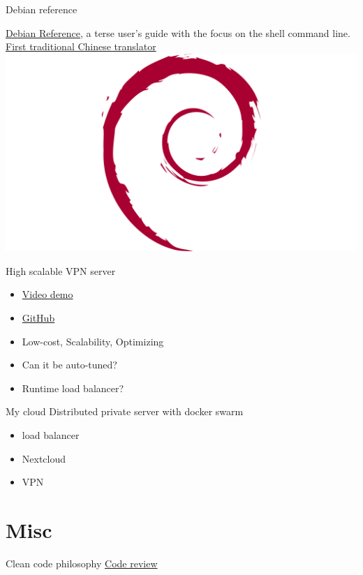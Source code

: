 \documentclass{beamer}
\begin{document}
\begin{frame}{Debian reference}
    \begin{multicols*}{2}
        {
            \href{https://www.debian.org/doc/manuals/debian-reference/index.zh-tw.html}{Debian Reference}, a terse user's guide with the focus on the shell command line.\\
            \href{https://salsa.debian.org/debian/debian-reference/-/blob/latest/po/zh-tw.add}{First traditional Chinese translator}
        }
        \includegraphics[width=.5\textwidth]{images/debian.png}
    \end{multicols*}
\end{frame}

\begin{frame}{High scalable VPN server}
    \begin{itemize}
        \item \href{https://scc-net.tw/nextcloud/s/D5JSGsRgEayTYkE}{Video demo}
        \item \href{https://github.com/25077667/scalable_wg}{GitHub}
        \item Low-cost, Scalability, Optimizing
        \item Can it be auto-tuned?
        \item Runtime load balancer?
    \end{itemize}
\end{frame}

\begin{frame}{My cloud}
    Distributed private server with docker swarm
    \begin{itemize}
        \item load balancer
        \item Nextcloud
        \item VPN
    \end{itemize}
\end{frame}

\section{Misc}
\begin{frame}{Clean code philosophy}
    \centering
    \href{https://dorm.scc-net.tw/}{Code review}
\end{frame}
\end{document}

